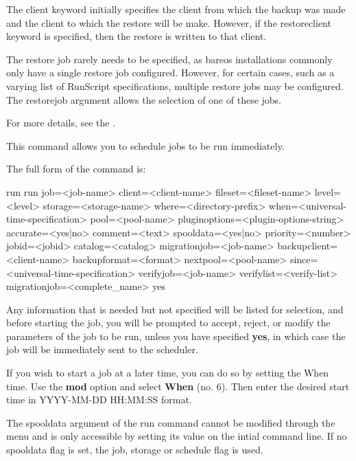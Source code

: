 \begin{description}
   The client keyword initially specifies the client from which the backup
   was made and the client to which the restore will be make.  However,
   if the restoreclient keyword is specified, then the restore is written
   to that client.

   The restore job rarely needs to be specified, as bareos installations
   commonly only have a single restore job configured. However, for certain
   cases, such as a varying list of RunScript specifications, multiple
   restore jobs may be configured. The restorejob argument allows the
   selection of one of these jobs.

    For more details, see the .

\item [run]
   This command allows you to schedule jobs  to be run immediately.

   The full form of the command is:

\begin{bconsole}{run}
run job=<job-name> client=<client-name> fileset=<fileset-name>
   level=<level> storage=<storage-name> where=<directory-prefix>
   when=<universal-time-specification> pool=<pool-name>
   pluginoptions=<plugin-options-string> accurate=<yes|no>
   comment=<text> spooldata=<yes|no> priority=<number>
   jobid=<jobid> catalog=<catalog> migrationjob=<job-name> backupclient=<client-name>
   backupformat=<format> nextpool=<pool-name> since=<universal-time-specification>
   verifyjob=<job-name> verifylist=<verify-list> migrationjob=<complete_name>
   yes
\end{bconsole}

   Any information that is needed but not specified will be listed for
   selection, and before starting the job, you will be prompted to accept,
   reject, or modify the parameters of the job to be run, unless you have
   specified {\bf yes}, in which case the job will be immediately sent to
   the scheduler.

   If you wish to start a job at a later time, you can do so by setting  the When
   time. Use the {\bf mod} option and select {\bf When} (no. 6).  Then enter the
   desired start time in YYYY-MM-DD HH:MM:SS format.

   The spooldata argument of the run command cannot be modified through the menu
   and is only accessible by setting its value on the intial command line. If
   no spooldata flag is set, the job, storage or schedule flag is used.


\end{description}
